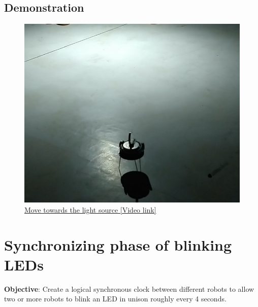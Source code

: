 \documentclass{article}
\begin{document}
\subsection{Demonstration}
\begin{figure}
	\centering
	\includegraphics[scale=0.4]{images/move_towards_light}
	\caption{\href{https://www.google.com/url?sa=j&url=https\%3A\%2F\%2Fphotos.app.goo.gl\%2FnUNghDg4nJygpzUu5&uct=1551610784&usg=G0tZGJ7iMN79F5qGk1QMw5rfodM.}{Move towards the light source [Video link]}}
\end{figure}
\section{Synchronizing phase of blinking LEDs}
\textbf{Objective}: Create a logical synchronous clock between different 
robots to allow two or more robots to blink an LED in unison roughly every 4 seconds.
\end{document}

